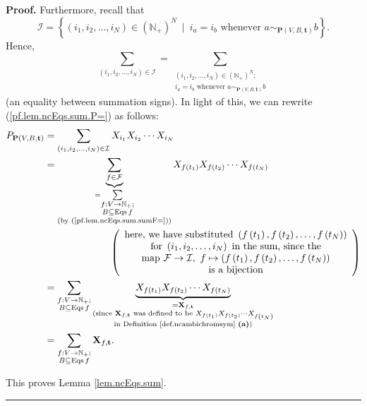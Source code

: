 \documentclass[numbers=enddot,12pt,final,onecolumn,notitlepage]{scrartcl}%
\theoremstyle{definition}
\newenvironment{proof}[1][Proof]{\noindent\textbf{#1.} }{\ \rule{0.5em}{0.5em}}
\newenvironment{verlong}{}{}
\let\sumnonlimits\sum
\renewcommand{\sum}{\sumnonlimits\limits}
\begin{document}
\begin{proof}
\begin{verlong}
Furthermore, recall that%
\[
\mathcal{I}=\left\{  \left(  i_{1},i_{2},\ldots,i_{N}\right)  \in\left(
\mathbb{N}_{+}\right)  ^{N}\ \mid\ i_{a}=i_{b}\text{ whenever }a\sim
_{\mathbf{P}\left(  V,B,\mathbf{t}\right)  }b\right\}  .
\]
Hence,
\[
\sum_{\left(  i_{1},i_{2},\ldots,i_{N}\right)  \in\mathcal{I}}=\sum
_{\substack{\left(  i_{1},i_{2},\ldots,i_{N}\right)  \in\left(  \mathbb{N}%
_{+}\right)  ^{N};\\i_{a}=i_{b}\text{ whenever }a\sim_{\mathbf{P}\left(
V,B,\mathbf{t}\right)  }b}}
\]
(an equality between summation signs). In light of this, we can rewrite
(\ref{pf.lem.ncEqs.sum.P=}) as follows:%
\begin{align*}
P_{\mathbf{P}\left(  V,B,\mathbf{t}\right)  }  &  =\sum_{\left(  i_{1}%
,i_{2},\ldots,i_{N}\right)  \in\mathcal{I}}X_{i_{1}}X_{i_{2}}\cdots X_{i_{N}%
}\\
&  =\underbrace{\sum_{f\in\mathcal{F}}}_{\substack{=\sum
_{\substack{f:V\rightarrow\mathbb{N}_{+};\\B\subseteq\operatorname*{Eqs}%
f}}\\\text{(by (\ref{pf.lem.ncEqs.sum.sumF=}))}}}X_{f\left(  t_{1}\right)
}X_{f\left(  t_{2}\right)  }\cdots X_{f\left(  t_{N}\right)  }\\
&  \ \ \ \ \ \ \ \ \ \ \ \ \ \ \ \ \ \ \ \ \left(
\begin{array}
[c]{c}%
\text{here, we have substituted }\left(  f\left(  t_{1}\right)  ,f\left(
t_{2}\right)  ,\ldots,f\left(  t_{N}\right)  \right) \\
\text{for }\left(  i_{1},i_{2},\ldots,i_{N}\right)  \text{ in the sum, since
the}\\
\text{map }\mathcal{F}\rightarrow\mathcal{I},\ f\mapsto\left(  f\left(
t_{1}\right)  ,f\left(  t_{2}\right)  ,\ldots,f\left(  t_{N}\right)  \right)
\\
\text{is a bijection}%
\end{array}
\right) \\
&  =\sum_{\substack{f:V\rightarrow\mathbb{N}_{+};\\B\subseteq
\operatorname*{Eqs}f}}\underbrace{X_{f\left(  t_{1}\right)  }X_{f\left(
t_{2}\right)  }\cdots X_{f\left(  t_{N}\right)  }}_{\substack{=\mathbf{X}%
_{f,\mathbf{t}}\\\text{(since }\mathbf{X}_{f,\mathbf{t}}\text{ was defined to
be }X_{f\left(  t_{1}\right)  }X_{f\left(  t_{2}\right)  }\cdots X_{f\left(
t_{N}\right)  }\\\text{in Definition \ref{def.ncambichromsym} \textbf{(a)})}%
}}\\
&  =\sum_{\substack{f:V\rightarrow\mathbb{N}_{+};\\B\subseteq
\operatorname*{Eqs}f}}\mathbf{X}_{f,\mathbf{t}}.
\end{align*}

\end{verlong}

This proves Lemma \ref{lem.ncEqs.sum}.
\end{proof}
\end{document}
